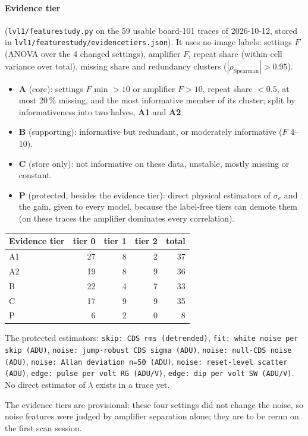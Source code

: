 \documentclass[10pt]{article}
\newcommand{\code}[1]{\texttt{#1}}
\renewcommand{\_}{\oldunderscore\allowbreak}
\begin{document}
{\raggedright\paragraph{Evidence tier} (\code{lvl1/feature\_study.py} on the 59 usable board-101 traces of 2026-10-12, stored in
\code{lvl1/feature\_study/evidence\_tiers.json}). It uses no image labels: settings $F$ (ANOVA over the 4 changed settings), amplifier
$F$, repeat share (within-cell variance over total), missing share and redundancy clusters ($|\rho_\text{Spearman}|>0.95$).\par}
\begin{itemize}
  \item \textbf{A} (core): settings $F$ min $>10$ or amplifier $F>10$, repeat share $<0.5$, at most 20\,\% missing, and the most
        informative member of its cluster; split by informativeness into two halves, \textbf{A1} and \textbf{A2}.
  \item \textbf{B} (supporting): informative but redundant, or moderately informative ($F$ 4--10).
  \item \textbf{C} (store only): not informative on these data, unstable, mostly missing or constant.
  \item \textbf{P} (protected, besides the evidence tier): direct physical estimators of $\sigma_e$ and the gain, given to every
        model, because the label-free tiers can demote them (on these traces the amplifier dominates every correlation).
\end{itemize}
\begin{center}
\begin{tabular}{lrrrr}
\toprule
Evidence tier & tier 0 & tier 1 & tier 2 & total \\
\midrule
A1 & 27 & 8 & 2 & 37 \\
A2 & 19 & 8 & 9 & 36 \\
B & 22 & 4 & 7 & 33 \\
C & 17 & 9 & 9 & 35 \\
P & 6 & 2 & 0 & 8 \\
\bottomrule
\end{tabular}
\end{center}
{\raggedright The protected estimators: \code{skip: CDS rms (detrended)}, \code{fit: white noise per skip (ADU)}, \code{noise: jump-robust CDS sigma (ADU)}, \code{noise: null-CDS noise (ADU)}, \code{noise: Allan deviation n=50 (ADU)}, \code{noise: reset-level scatter (ADU)}, \code{edge: pulse per volt RG (ADU/V)}, \code{edge: dip per volt SW (ADU/V)}. No direct estimator of $\lambda$
exists in a trace yet.\par} The evidence tiers are provisional: these four settings did not change the noise, so noise features were
judged by amplifier separation alone; they are to be rerun on the first scan session.
\end{document}
